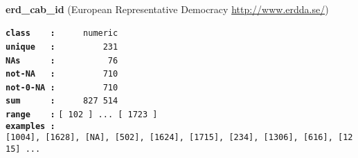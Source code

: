 \documentclass[]{article}
\begin{document}
~

\textbf{erd\_cab\_id} (European Representative Democracy
\url{http://www.erdda.se/})

\textbf{\texttt{class\ \ \ \ :}} \texttt{~~~~~numeric}\\
\textbf{\texttt{unique\ \ \ :}} \texttt{~~~~~~~~~231}\\
\textbf{\texttt{NAs\ \ \ \ \ \ :}} \texttt{~~~~~~~~~~76}\\
\textbf{\texttt{not-NA\ \ \ :}} \texttt{~~~~~~~~~710}\\
\textbf{\texttt{not-0-NA\ :}} \texttt{~~~~~~~~~710}\\
\textbf{\texttt{sum\ \ \ \ \ \ :}} \texttt{~~~~~827~514}\\
\textbf{\texttt{range\ \ \ \ :}}
\texttt{{[}\ 102\ {]}\ ...\ {[}\ 1723\ {]}}\\
\textbf{\texttt{examples\ :}}
\texttt{{[}1004{]},\ {[}1628{]},\ {[}NA{]},\ {[}502{]},\ {[}1624{]},\ {[}1715{]},\ {[}234{]},\ {[}1306{]},\ {[}616{]},\ {[}1215{]}\ ...}\\

~
\end{document}
